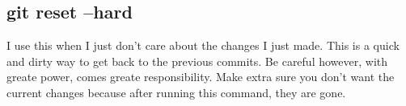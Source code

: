 \documentclass{article}
\begin{document}
\subsection{git reset --hard}
I use this when I just don't care about the changes I just made. This is a quick and dirty way to
get back to the previous commits. Be careful however, with greate power, comes greate responsibility.
Make extra sure you don't want the current changes because after running this command, they are gone.
\end{document}
